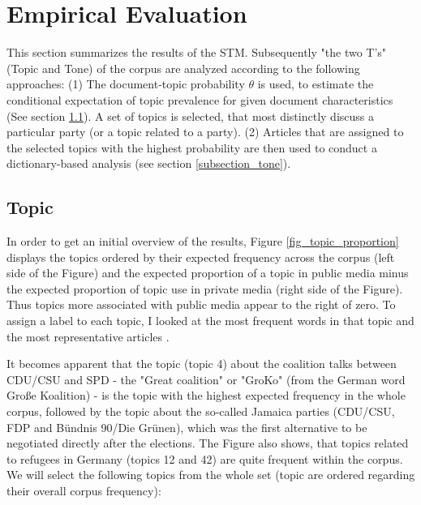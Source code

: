 \documentclass[12pt,a4paper,notitlepage]{article}
\begin{document}
\section{Empirical Evaluation}\label{ch_empirical}

This section summarizes the results of the STM. Subsequently "the two T's" (Topic and Tone) of the corpus are analyzed according to the following approaches: (1) The document-topic probability $\theta$ is used, to estimate the conditional expectation of topic prevalence for given document characteristics (See section \ref{subsection_topic}). A set of topics is selected, that most distinctly discuss a particular party (or a topic related to a party). (2) Articles that are assigned to the selected topics with the highest probability are then used to conduct a dictionary-based analysis (see section \ref{subsection_tone}). 

\subsection{Topic}\label{subsection_topic}

In order to get an initial overview of the results, Figure \ref{fig_topic_proportion} displays the topics ordered by their expected frequency across the corpus (left side of the Figure) and the expected proportion of a topic in public media minus the expected proportion of topic use in private media (right side of the Figure). Thus topics more associated with public media appear to the right of zero. To assign a label to each topic, I looked at the most frequent words in that topic and the most representative articles \citep{roberts_model_2016}. 

It becomes apparent that the topic (topic 4) about the coalition talks between CDU/CSU and SPD - the "Great coalition" or "GroKo" (from the German word Große Koalition) - is the topic with the highest expected frequency in the whole corpus, followed by the topic about the so-called Jamaica parties (CDU/CSU, FDP and Bündnis 90/Die Grünen), which was the first alternative to be negotiated directly after the elections. The Figure also shows, that topics related to refugees in Germany (topics 12 and 42) are quite frequent within the corpus. We will select the following topics from the whole set (topic are ordered regarding their overall corpus frequency):
\end{document}

